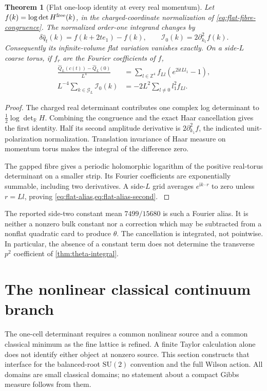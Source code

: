 \documentclass[11pt,oneside,openany]{book}
\newtheorem{theorem}{Theorem}[chapter]
\theoremstyle{definition}
\theoremstyle{remark}
\newcommand{\R}{\mathbb R}
\newcommand{\Z}{\mathbb Z}
\newcommand{\ii}{\mathrm i}
\newcommand{\SU}{\mathrm{SU}}
\newcommand{\src}[2]{\cite[#2]{#1}}
\begin{document}
\begin{theorem}[Flat one-loop identity at every real momentum]
\label{thm:flat-bloch}
Let $f(k)=\log\det H^{\rm free}(k)$, in the charged-coordinate
normalization of \cref{eq:flat-fibre-congruence}. The normalized
order-one integrand changes by
\[
 \delta\widehat q_t(k)=f(k+2te_1)-f(k),\qquad
 \mathcal I_0(k)=2\partial_{k_1}^2f(k).
\]
Consequently its infinite-volume flat variation vanishes exactly. On a
side-$L$ coarse torus, if $f_r$ are the Fourier coefficients of $f$,
\begin{align}
 \frac{\widehat Q_L(c(t))-\widehat Q_L(0)}{L^4}
   &=\sum_{l\in\Z^4}f_{Ll}(e^{2\ii tLl_1}-1),\label{eq:flat-alias}\\
 L^{-4}\sum_{k\in\mathcal G_L}\mathcal I_0(k)
   &=-2L^2\sum_{l\ne0}l_1^2 f_{Ll}.\label{eq:flat-alias-second}
\end{align}
\end{theorem}
\begin{proof}
The charged real determinant contributes one complex log determinant
to $\tfrac12\log\det_{\R}H$. Combining the congruence and the exact
Haar cancellation gives the first identity. Half its second amplitude
derivative is $2\partial_{k_1}^2f$, the indicated unit-polarization
normalization. Translation invariance of Haar measure on momentum
torus makes the integral of the difference zero.

The gapped fibre gives a periodic holomorphic logarithm of the positive
real-torus determinant on a smaller strip. Its Fourier coefficients
are exponentially summable, including two derivatives. A side-$L$
grid averages $e^{\ii k\cdot r}$ to zero unless $r=Ll$, proving
\cref{eq:flat-alias,eq:flat-alias-second}. \src{F12}{V9}
\end{proof}
The reported side-two constant mean $7499/15680$ is such a Fourier
alias. It is neither a nonzero bulk constant nor a correction which
may be subtracted from a nonflat quadratic card to produce $\theta$.
The cancellation is integrated, not pointwise. In particular, the
absence of a constant term does not determine the transverse $p^2$
coefficient of \cref{thm:theta-integral}.

\section{The nonlinear classical continuum branch}
\label{sec:classical-root-continuum}
The one-cell determinant requires a common nonlinear source and a common
classical minimum as the fine lattice is refined. A finite Taylor
calculation alone does not identify either object at nonzero source.
This section constructs that interface for the balanced-root $\SU(2)$
convention and the full Wilson action. All domains are small classical
domains; no statement about a compact Gibbs measure follows from them.
\end{document}
